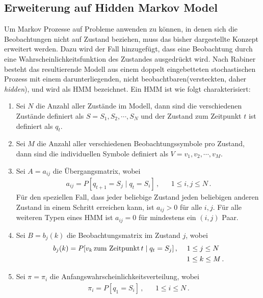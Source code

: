 \subsection{Erweiterung auf Hidden Markov Model}
Um Markov Prozesse auf Probleme anwenden zu k\"onnen, in denen sich die Beobachtungen nicht auf Zustand beziehen, muss das bisher dargestellte Konzept erweitert werden. Dazu wird der Fall hinzugef\"ugt, dass eine Beobachtung durch eine Wahrscheinlichkeitsfunktion des Zustandes ausgedr\"uckt wird. Nach Rabiner~\cite{bib:hmmrabiner} besteht das resultierende Modell aus einem doppelt eingebetteten stochastischen Prozess mit einem darunterliegenden, nicht beobachtbaren(versteckten, daher \textit{hidden}),  und wird als \gls{HMM} bezeichnet.
\newline
Ein \acrshort{HMM} ist wie folgt charakterisiert:
\begin{enumerate}
\item Sei $N$ die Anzahl aller Zust\"ande im Modell, dann sind die verschiedenen Zust\"ande definiert als $S = {S_1, S_2, \cdots, S_N}$ und der Zustand zum Zeitpunkt $t$ ist definiert als $q_t$.
\item Sei $M$ die Anzahl aller verschiedenen Beobachtungssymbole pro Zustand, dann sind die individuellen Symbole definiert als $V = {v_1, v_2, \cdots, v_M}$.
\item Sei $A = {a_{ij}}$ die \"Ubergangsmatrix, wobei
\begin{align}
a_{ij} = P[q_{t+1} = S_j \mid q_t = S_i] \, , & & 1 \leq i, j \leq N \, .
\end{align}
F\"ur den speziellen Fall, dass jeder beliebige Zustand jeden beliebigen anderen Zustand in einem Schritt erreichen kann, ist $a_{ij} > 0$ f\"ur alle $i, j$. F\"ur alle weiteren Typen eines \acrshort{HMM} ist $a_{ij} = 0$ f\"ur mindestens ein $(i, j)$ Paar.
\item Sei $B = {b_j(k)}$ die Beobachtungsmatrix im Zustand $j$, wobei
\begin{align}
b_j(k) = P[v_k \,\mbox{zum Zeitpunkt} \, t \mid q_t = S_j]\, , & & 1 \leq j \leq N \, \, \, \,  \notag \\
& & \, \, 1 \leq k \leq M \, .
\end{align}
\item Sei $\pi = {\pi_i}$ die Anfangswahrscheinlichkeitsverteilung, wobei
\begin{align}
\pi_i = P [q_1 = S_i] \, , & & 1 \leq i \leq N \, .
\end{align}
\end{enumerate}
